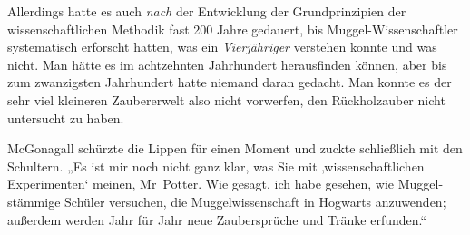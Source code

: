 Allerdings hatte es auch \emph{nach} der Entwicklung der Grundprinzipien der wissenschaftlichen Methodik fast 200 Jahre gedauert, bis Muggel-Wissenschaftler systematisch erforscht hatten, was ein \emph{Vierjähriger} verstehen konnte und was nicht. Man hätte es im achtzehnten Jahrhundert herausfinden können, aber bis zum zwanzigsten Jahrhundert hatte niemand daran gedacht. Man konnte es der sehr viel kleineren Zaubererwelt also nicht vorwerfen, den Rückholzauber nicht untersucht zu haben.

McGonagall schürzte die Lippen für einen Moment und zuckte schließlich mit den Schultern.
„Es ist mir noch nicht ganz klar, was Sie mit ‚wissenschaftlichen Experimenten‘ meinen, Mr~Potter. Wie gesagt, ich habe gesehen, wie Muggel-stämmige Schüler versuchen, die Muggelwissenschaft in Hogwarts anzuwenden; außerdem werden Jahr für Jahr neue Zaubersprüche und Tränke erfunden.“

